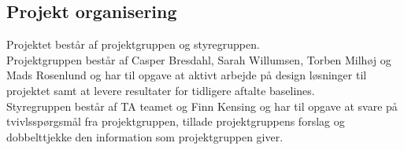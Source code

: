 \subsection{Projekt organisering}
Projektet består af projektgruppen og styregruppen.\\
Projektgruppen består af Casper Bresdahl, Sarah Willumsen, Torben Milhøj og Mads Rosenlund og har til opgave at aktivt arbejde på design løsninger til projektet samt at levere resultater for tidligere aftalte baselines.\\
Styregruppen består af TA teamet og Finn Kensing og har til opgave at svare på tvivlsspørgsmål fra projektgruppen, tillade projektgruppens forslag og dobbelttjekke den information som projektgruppen giver.